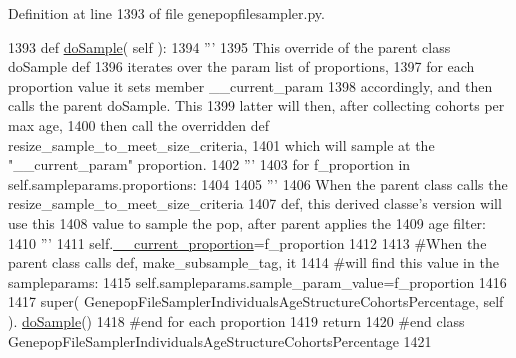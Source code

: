 Definition at line 1393 of file genepopfilesampler.\+py.


\begin{DoxyCode}
1393     \textcolor{keyword}{def }\hyperlink{classnegui_1_1genepopfilesampler_1_1GenepopFileSamplerIndividualsAgeStructureCohortsPercentage_a295926d11ecac7194c52615902bdaf3c}{doSample}( self ):
1394         \textcolor{stringliteral}{'''}
1395 \textcolor{stringliteral}{        This override of the parent class doSample def}
1396 \textcolor{stringliteral}{        iterates over the param list of proportions, }
1397 \textcolor{stringliteral}{        for each proportion value it sets member \_\_current\_param}
1398 \textcolor{stringliteral}{        accordingly, and then calls the parent doSample.  This }
1399 \textcolor{stringliteral}{        latter will then, after collecting cohorts per max age,}
1400 \textcolor{stringliteral}{        then call the overridden def resize\_sample\_to\_meet\_size\_criteria, }
1401 \textcolor{stringliteral}{        which will sample at the "\_\_current\_param" proportion.}
1402 \textcolor{stringliteral}{        '''}
1403         \textcolor{keywordflow}{for} f\_proportion \textcolor{keywordflow}{in} self.sampleparams.proportions:
1404 
1405             \textcolor{stringliteral}{'''}
1406 \textcolor{stringliteral}{            When the parent class calls the resize\_sample\_to\_meet\_size\_criteria}
1407 \textcolor{stringliteral}{            def, this derived classe's version will use this}
1408 \textcolor{stringliteral}{            value to sample the pop, after parent applies the}
1409 \textcolor{stringliteral}{            age filter:}
1410 \textcolor{stringliteral}{            '''}
1411             self.\hyperlink{classnegui_1_1genepopfilesampler_1_1GenepopFileSamplerIndividualsAgeStructureCohortsPercentage_a20c7fca4ce503d025b2728ee416b1d6a}{\_\_current\_proportion}=f\_proportion
1412 
1413             \textcolor{comment}{#When the parent class calls def, make\_subsample\_tag, it}
1414             \textcolor{comment}{#will find this value in the sampleparams:}
1415             self.sampleparams.sample\_param\_value=f\_proportion 
1416 
1417             super( GenepopFileSamplerIndividualsAgeStructureCohortsPercentage, self ).
      \hyperlink{classnegui_1_1genepopfilesampler_1_1GenepopFileSamplerIndividualsAgeStructureCohortsPercentage_a295926d11ecac7194c52615902bdaf3c}{doSample}()
1418         \textcolor{comment}{#end for each proportion}
1419         \textcolor{keywordflow}{return}
1420 \textcolor{comment}{#end class GenepopFileSamplerIndividualsAgeStructureCohortsPercentage}
1421 
\end{DoxyCode}
